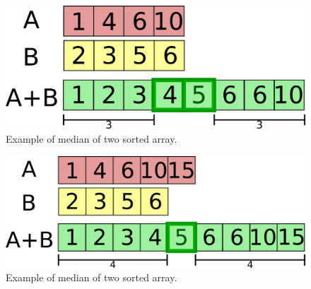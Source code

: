 \begin{figure}
	\label{fig:median_sorted_arrays:example1}
	\centering
	\includegraphics[scale=1.0]{sources/median_sorted_arrays/images/example1}
	\caption{Example of median of two sorted array.}
\end{figure}

\begin{figure}
	\label{fig:median_sorted_arrays:example2}
	\centering
	\includegraphics[scale=1.0]{sources/median_sorted_arrays/images/example2}
	\caption{Example of median of two sorted array.}
\end{figure}

%
%	

